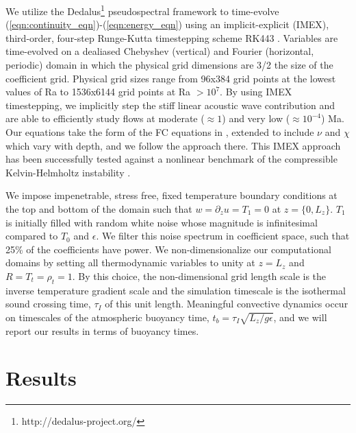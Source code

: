 \documentclass[aps, prl, twocolumn, nofootinbib, groupedaddress, amsfonts, amssymb, amsmath]{revtex4-1}
\begin{document}
We utilize the 
Dedalus\footnote{http://dedalus-project.org/} \cite{burns&all2016} pseudospectral framework 
 to time-evolve  
(\ref{eqn:continuity_eqn})-(\ref{eqn:energy_eqn}) 
using an implicit-explicit (IMEX), third-order, four-step 
Runge-Kutta timestepping scheme RK443 \cite{ascher&all1997}.  
Variables are time-evolved on a dealiased Chebyshev (vertical)
and Fourier (horizontal, periodic) domain in which the
physical grid dimensions are 3/2 the size of the coefficient grid.  
Physical grid sizes range from
96x384 grid points at the lowest values of 
Ra to 1536x6144 grid points at Ra $> 10^{7}$. 
By using IMEX timestepping, we implicitly step the 
stiff linear acoustic wave contribution and are able to
efficiently study flows at moderate ($\approx 1$) and very low ($\approx 10^{-4}$)
Ma.  Our equations take the form
of the FC equations in \cite{lecoanet&all2014}, extended to include
$\nu$ and $\chi$ which vary with depth, and we follow the approach there.
This IMEX approach has been successfully 
tested against a nonlinear benchmark  of the compressible 
Kelvin-Helmholtz instability \cite{Lecoanet_et_al_2016_KH}.

We impose
impenetrable, stress free, fixed temperature boundary conditions at
the top and bottom of the domain such that 
$w = \partial_z u = T_1 = 0$ at $z = \{0, L_z\}$. 
$T_1$ is initially filled with
random white noise whose magnitude is infinitesimal
compared to $T_0$ and $\epsilon$.
We filter this noise spectrum in coefficient space, such that 25\% of the coefficients
have power. We non-dimensionalize our computational domains by setting
all thermodynamic variables to unity at $z = L_z$ and
$R = T_t = \rho_t = 1$.  By this choice, the non-dimensional
grid length scale is the inverse temperature gradient scale and the 
simulation timescale is the isothermal sound crossing time, $\tau_I$ of this unit length.
Meaningful convective dynamics occur on timescales of the atmospheric buoyancy time,
$t_b = \tau_I \sqrt{L_z/g\epsilon}$, and we will report our results in terms of
buoyancy times.

\section{Results}
\label{sec:results}
\end{document}
